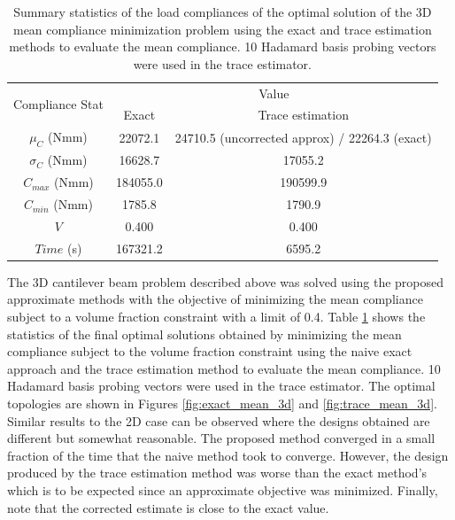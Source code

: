     \begin{table}
     \centering
     \caption{Summary statistics of the load compliances of the optimal solution of the 3D mean compliance minimization problem using the exact and trace estimation methods to evaluate the mean compliance. 10 Hadamard basis probing vectors were used in the trace estimator.}
     \begin{tabular}{|c|c|c|}
      \hline
      \multirow{2}{5em}{Compliance Stat} & \multicolumn{2}{c|}{Value} \\\cline{2-3}
      & Exact & Trace estimation \\
      \hline
      \hline
      $\mu_C$ (Nmm) & 22072.1 & 24710.5 (uncorrected approx) / 22264.3 (exact) \\
      \hline
      $\sigma_C$ (Nmm) & 16628.7 & 17055.2 \\
      \hline
      $C_{max}$ (Nmm) & 184055.0 & 190599.9 \\
      \hline
      $C_{min}$ (Nmm) & 1785.8 & 1790.9 \\
      \hline
      $V$ & 0.400 & 0.400 \\
      \hline
      $Time$ (s) & 167321.2 & 6595.2 \\
      \hline
     \end{tabular}
     \label{tab:mean_stats_3d}
    \end{table}

    The 3D cantilever beam problem described above was solved using the proposed approximate methods with the objective of minimizing the mean compliance subject to a volume fraction constraint with a limit of 0.4. Table \ref{tab:mean_stats_3d} shows the statistics of the final optimal solutions obtained by minimizing the mean compliance subject to the volume fraction constraint using the naive exact approach and the trace estimation method to evaluate the mean compliance. 10 Hadamard basis probing vectors were used in the trace estimator. The optimal topologies are shown in Figures \ref{fig:exact_mean_3d} and \ref{fig:trace_mean_3d}. Similar results to the 2D case can be observed where the designs obtained are different but somewhat reasonable. The proposed method converged in a small fraction of the time that the naive method took to converge. However, the design produced by the trace estimation method was worse than the exact method's which is to be expected since an approximate objective was minimized. Finally, note that the corrected estimate is close to the exact value.

